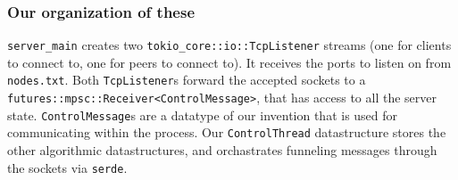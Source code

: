 \documentclass{article}
\begin{document}
\subsubsection*{Our organization of these}
\verb|server_main| creates two \verb|tokio_core::io::TcpListener| streams (one for clients to connect to, one for peers to connect to).
It receives the ports to listen on from \verb|nodes.txt|.
Both \verb|TcpListener|s forward the accepted sockets to a \verb|futures::mpsc::Receiver<ControlMessage>|, that has access to all the server state.
\verb|ControlMessage|s are a datatype of our invention that is used for communicating within the process.
Our \verb|ControlThread| datastructure stores the other algorithmic datastructures, and orchastrates funneling messages through the sockets via \verb|serde|.
\end{document}
